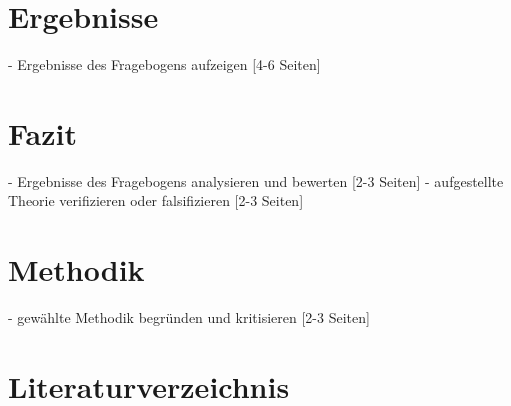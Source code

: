 \documentclass[a4paper]{scrartcl}
\begin{document}
\section{Ergebnisse}
    - Ergebnisse des Fragebogens aufzeigen [4-6 Seiten]

\section{Fazit}
    - Ergebnisse des Fragebogens analysieren und bewerten [2-3 Seiten]
    - aufgestellte Theorie verifizieren oder falsifizieren [2-3 Seiten]

\section{Methodik}
    - gewählte Methodik begründen und kritisieren [2-3 Seiten]


\newpage


\setcounter{page}{6}


\section*{Literaturverzeichnis}

\singlespacing
\end{document}
